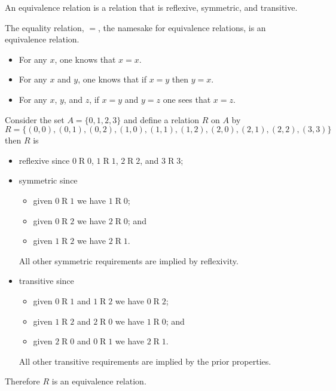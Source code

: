 \begin{definition}
    An equivalence relation is a relation that is reflexive, symmetric, and transitive.
\end{definition}

\begin{example}
    The equality relation, $=$, the namesake for equivalence relations, is an equivalence relation.
    \begin{itemize}
        \item For any $x$, one knows that $x = x$.
        \item For any $x$ and $y$, one knows that if $x = y$ then $y = x$.
        \item For any $x$, $y$, and $z$, if $x = y$ and $y = z$ one sees that $x = z$.
    \end{itemize}
\end{example}

\begin{example}
    Consider the set $A = \{0, 1, 2, 3\}$ and define a relation $R$ on $A$ by
    \[
        R = \{(0, 0), (0, 1), (0, 2), (1, 0), (1, 1), (1, 2), (2, 0), (2, 1), (2, 2), (3, 3)\}
    \]
    then $R$ is
    \begin{itemize}
        \item reflexive since $0\mathrel{R}0$, $1\mathrel{R}1$, $2\mathrel{R}2$, and $3\mathrel{R}3$;
        \item symmetric since
        \begin{itemize}
            \item given $0\mathrel{R}1$ we have $1\mathrel{R}0$;
            \item given $0\mathrel{R}2$ we have $2\mathrel{R}0$; and
            \item given $1\mathrel{R}2$ we have $2\mathrel{R}1$.
        \end{itemize}
        All other symmetric requirements are implied by reflexivity.
        \item transitive since
        \begin{itemize}
            \item given $0\mathrel{R}1$ and $1\mathrel{R}2$ we have $0\mathrel{R}2$;
            \item given $1\mathrel{R}2$ and $2\mathrel{R}0$ we have $1\mathrel{R}0$; and
            \item given $2\mathrel{R}0$ and $0\mathrel{R}1$ we have $2\mathrel{R}1$.
        \end{itemize}
        All other transitive requirements are implied by the prior properties.
    \end{itemize}
    Therefore $R$ is an equivalence relation.
\end{example}

